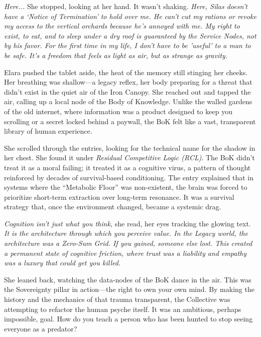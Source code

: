\textit{Here...} She stopped, looking at her hand. It wasn't shaking. \textit{Here, Silas doesn't have a `Notice of Termination' to hold over me. He can't cut my rations or revoke my access to the vertical orchards because he's annoyed with me. My right to exist, to eat, and to sleep under a dry roof is guaranteed by the Service Nodes, not by his favor. For the first time in my life, I don't have to be 'useful' to a man to be safe. It's a freedom that feels as light as air, but as strange as gravity.}


Elara pushed the tablet aside, the heat of the memory still stinging her cheeks. Her breathing was shallow—a legacy reflex, her body preparing for a threat that didn't exist in the quiet air of the Iron Canopy. She reached out and tapped the air, calling up a local node of the Body of Knowledge. Unlike the walled gardens of the old internet, where information was a product designed to keep you scrolling or a secret locked behind a paywall, the BoK felt like a vast, transparent library of human experience.


She scrolled through the entries, looking for the technical name for the shadow in her chest. She found it under \textit{Residual Competitive Logic (RCL)}. The BoK didn't treat it as a moral failing; it treated it as a cognitive virus, a pattern of thought reinforced by decades of survival-based conditioning. The entry explained that in systems where the ``Metabolic Floor'' was non-existent, the brain was forced to prioritize short-term extraction over long-term resonance. It was a survival strategy that, once the environment changed, became a systemic drag.

\textit{Cognition isn't just what you think,} she read, her eyes tracking the glowing text. \textit{It is the architecture through which you perceive value. In the Legacy world, the architecture was a Zero-Sum Grid. If you gained, someone else lost. This created a permanent state of cognitive friction, where trust was a liability and empathy was a luxury that could get you killed.}

She leaned back, watching the data-nodes of the BoK dance in the air. This was the Sovereignty pillar in action—the right to own your own mind. By making the history and the mechanics of that trauma transparent, the Collective was attempting to refactor the human psyche itself. It was an ambitious, perhaps impossible, goal. How do you teach a person who has been hunted to stop seeing everyone as a predator?

